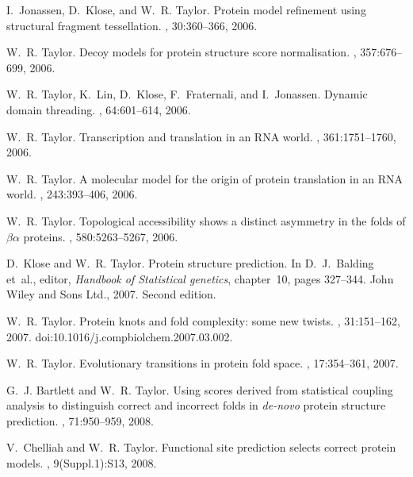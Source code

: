 \begin{thebibliography}{100}
I.~Jonassen, D.~Klose, and W.~R. Taylor.
\newblock Protein model refinement using structural fragment tessellation.
, 30:360--366, 2006.

W.~R. Taylor.
\newblock Decoy models for protein structure score normalisation.
, 357:676--699, 2006.

W.~R. Taylor, K.~Lin, D.~Klose, F.~Fraternali, and I.~Jonassen.
\newblock Dynamic domain threading.
, 64:601--614, 2006.

W.~R. Taylor.
\newblock Transcription and translation in an {RNA} world.
, 361:1751--1760, 2006.

W.~R. Taylor.
\newblock A molecular model for the origin of protein translation in an {RNA}
  world.
, 243:393--406, 2006.

W.~R. Taylor.
\newblock Topological accessibility shows a distinct asymmetry in the folds of
  $\beta\alpha$ proteins.
, 580:5263--5267, 2006.

D.~Klose and W.~R. Taylor.
\newblock Protein structure prediction.
\newblock In D.~J.~Balding et~al., editor, {\em Handbook of Statistical
  genetics}, chapter~10, pages 327--344. John Wiley and Sons Ltd., 2007.
\newblock Second edition.

W.~R. Taylor.
\newblock Protein knots and fold complexity: some new twists.
, 31:151--162, 2007.
\newblock doi:10.1016/j.compbiolchem.2007.03.002.

W.~R. Taylor.
\newblock Evolutionary transitions in protein fold space.
, 17:354--361, 2007.

G.~J. Bartlett and W.~R. Taylor.
\newblock Using scores derived from statistical coupling analysis to
  distinguish correct and incorrect folds in {\em de-novo} protein structure
  prediction.
, 71:950--959, 2008.

V.~Chelliah and W.~R. Taylor.
\newblock Functional site prediction selects correct protein models.
, 9(Suppl.1):S13, 2008.


\end{thebibliography}

